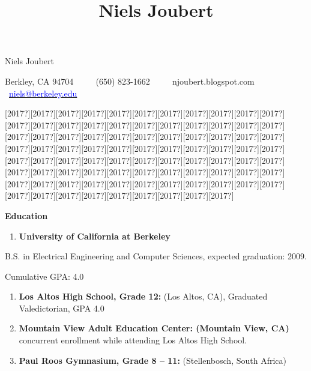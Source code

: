 \documentclass[12pt,twoside]{article}
\title{Niels Joubert}
\newcommand\liststyleWWviiiNumvi{%
\renewcommand\labelitemi{[F0A7?]}
\renewcommand\labelitemii{o}
\renewcommand\labelitemiii{[F0A7?]}
\renewcommand\labelitemiv{[F0B7?]}
}
\begin{document}
\clearpage\pagestyle{Standard}
{\raggedleft{}\sffamily
Niels Joubert
\par}

{\raggedleft{}
\textsf{Berkley, CA 94704 \ \ {\textbullet} \ \ (650) 823{}-1662
\ \ {\textbullet} \ \ njoubert.blogspot.com \ \ {\textbullet}
\ }\href{mailto:niels@berkeley.edu}{\textsf{\textcolor{blue}{niels@berkeley.edu}}}
\par}

{\centering{}
[2017?][2017?][2017?][2017?][2017?][2017?][2017?][2017?][2017?][2017?][2017?][2017?][2017?][2017?][2017?][2017?][2017?][2017?][2017?][2017?][2017?][2017?][2017?][2017?][2017?][2017?][2017?][2017?][2017?][2017?][2017?][2017?][2017?][2017?][2017?][2017?][2017?][2017?][2017?][2017?][2017?][2017?][2017?][2017?][2017?][2017?][2017?][2017?][2017?][2017?][2017?][2017?][2017?][2017?][2017?][2017?][2017?][2017?][2017?][2017?][2017?][2017?][2017?][2017?][2017?][2017?][2017?][2017?][2017?][2017?][2017?][2017?][2017?][2017?][2017?][2017?][2017?][2017?][2017?][2017?][2017?][2017?][2017?][2017?][2017?][2017?]
\par}


\bigskip

{\sffamily\bfseries
Education}


\bigskip

\liststyleWWviiiNumvi
\begin{enumerate}
\item {\sffamily\bfseries
University of California at Berkeley }
\end{enumerate}
{\sffamily\mdseries
 B.S. in Electrical Engineering and Computer Sciences, expected
graduation: 2009.}

{\sffamily\mdseries
 Cumulative GPA: 4.0}

\liststyleWWviiiNumvi
\begin{enumerate}
\item {\sffamily
\textbf{Los Altos High School, Grade 12: }\textmd{(Los Altos, CA),
Graduated Valedictorian, GPA 4.0}}
\item {
\textsf{\textbf{Mountain View Adult Education Center: (Mountain View,
CA) }}\textsf{\textmd{concurrent enrollment while attending Los Altos
High School.}}}
\item {
\textsf{\textbf{Paul Roos Gymnasium, Grade 8 {--} 11:}}\textsf{
(Stellenbosch, South Africa)}}
\end{enumerate}
\end{document}
